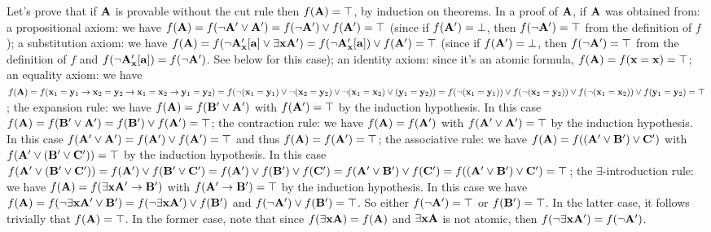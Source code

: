 Let's prove that if ${\bf A}$ is provable without the cut rule then $f({\bf A}) = \top$, by induction on theorems.
In a proof of ${\bf A}$, if ${\bf A}$ was obtained from:
\itemitem{$\bullet$} a propositional axiom: we have $f({\bf A}) = f(\neg {\bf A}' \lor {\bf A}') = f(\neg {\bf A}') \lor f({\bf A}') = \top$
(since if $f({\bf A}') = \bot$, then $f(\neg {\bf A}') = \top$ from the definition of $f$);
\itemitem{$\bullet$} a substitution axiom: we have 
$f({\bf A}) = f(\neg {\bf A}'_{\bf x}[{\bf a}] \lor \exists {\bf x}{\bf A}') = f(\neg {\bf A}'_{\bf x}[{\bf a}]) \lor f({\bf A}') = \top$ (since 
if $f({\bf A}') = \bot$, then $f(\neg {\bf A}') = \top$ from the definition of $f$ and $f(\neg {\bf A}'_{\bf x}[{\bf a}]) = f(\neg {\bf A}')$. See below for this case);
\itemitem{$\bullet$} an identity axiom: since it's an atomic formula, $f({\bf A}) = f({\bf x} = {\bf x}) = \top$;
\itemitem{$\bullet$} an equality axiom: we have $f({\bf A}) = 
f({\bf x}_1 = {\bf y}_1 \to {\bf x}_2 = {\bf y}_2 \to {\bf x}_1 = {\bf x}_2 \to {\bf y}_1 = {\bf y}_2) =
f(\neg ({\bf x}_1 = {\bf y}_1) \lor \neg ({\bf x}_2 = {\bf y}_2) \lor \neg ({\bf x}_1 = {\bf x}_2) \lor ({\bf y}_1 = {\bf y}_2)) =
f(\neg ({\bf x}_1 = {\bf y}_1)) \lor f(\neg ({\bf x}_2 = {\bf y}_2)) \lor f(\neg ({\bf x}_1 = {\bf x}_2)) \lor f({\bf y}_1 = {\bf y}_2) = \top$;
\itemitem{$\bullet$} the expansion rule: we have $f({\bf A}) = f({\bf B}' \lor {\bf A}')$ with $f({\bf A}') = \top$ by the induction hypothesis.
In this case $f({\bf A}) = f({\bf B}' \lor {\bf A}') = f({\bf B}') \lor f({\bf A}') = \top$;
\itemitem{$\bullet$} the contraction rule: we have $f({\bf A}) = f({\bf A}')$ with $f({\bf A}' \lor {\bf A}') = \top$ by the induction hypothesis. 
In this case $f({\bf A}' \lor {\bf A}') = f({\bf A}') \lor f({\bf A}') = \top$ and thus $f({\bf A}) = f({\bf A}') = \top$;
\itemitem{$\bullet$} the associative rule: we have $f({\bf A}) = f(({\bf A}' \lor {\bf B}') \lor {\bf C}')$ with $f({\bf A}' \lor ({\bf B}' \lor {\bf C}')) = \top$ by the induction hypothesis.
In this case $f({\bf A}' \lor ({\bf B}' \lor {\bf C}')) = f({\bf A}') \lor f({\bf B}' \lor {\bf C}') = f({\bf A}') \lor f({\bf B}') \lor f({\bf C}') =
f({\bf A}' \lor {\bf B}') \lor f({\bf C}') = f(({\bf A}' \lor {\bf B}') \lor {\bf C}') = \top$;
\itemitem{$\bullet$} the $\exists$-introduction rule: we have $f({\bf A}) = f(\exists {\bf x}{\bf A}' \to {\bf B}')$ with $f({\bf A}' \to {\bf B}') = \top$ by the induction hypothesis.
In this case we have $f({\bf A}) = f(\neg \exists {\bf x}{\bf A}' \lor {\bf B}') = f(\neg \exists {\bf x}{\bf A}') \lor f({\bf B}')$ and $f(\neg {\bf A}') \lor f({\bf B}') = \top$.
So either $f(\neg {\bf A}') = \top$ or $f({\bf B}') = \top$. In the latter case, it follows trivially that $f({\bf A}) = \top$. In the former case,
note that since $f(\exists {\bf x}{\bf A}) = f({\bf A})$ and $\exists {\bf x}{\bf A}$ is not atomic, then $f(\neg \exists {\bf x}{\bf A}') = f(\neg {\bf A}')$.

